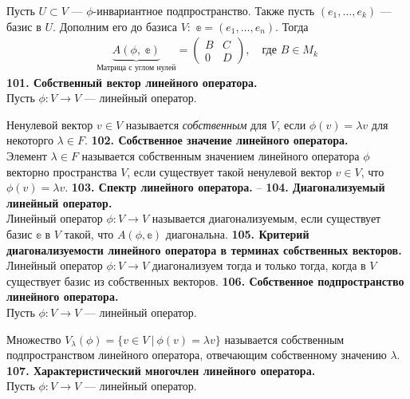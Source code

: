 \documentclass{article}
\begin{document}
Пусть $U\subset V$ --- $\phi$-инвариантное подпространство. Также пусть $(e_1, \ldots, e_k)$ --- базис в $U$. Дополним его до базиса $V\colon$ $\mathbb{e} = (e_1, \ldots, e_n)$. Тогда
\begin{gather}
    \underbrace{A(\phi,\;\mathbb{e})}_{\text{Матрица с углом нулей}} = \begin{pmatrix}
    B& C \\
    0& D
    \end{pmatrix}, \quad\text{где $B\in M_k$}
\end{gather}
\newline
\newline
\textbf{101. Собственный вектор линейного оператора.}\\
Пусть $\phi\colon V \rightarrow V$ --- линейный оператор.

Ненулевой вектор $v\in V$ называется \textit{собственным} для $V$, если $\phi(v) = \lambda v$ для некоторго $\lambda \in F$.
\newline
\newline
\textbf{102. Собственное значение линейного оператора.}\\
Элемент $\lambda \in F$ называется собственным значением линейного оператора $\phi$ векторно пространства $V$, если существует такой ненулевой вектор $v \in V$, что $\phi(v) =\lambda v$. 
\newline
\newline
\textbf{103. Спектр линейного оператора.}
--
\newline
\newline
\textbf{104. Диагонализуемый линейный оператор.}\\
Линейный оператор $\phi\colon V \rightarrow V$ называется диагонализуемым, если существует базис $\mathbb{e}$ в $V$ такой, что $A(\phi, \mathbb{e})$ диагональна. 
\newline
\newline
\textbf{105. Критерий диагонализуемости линейного оператора в терминах собственных векторов.}\\
Линейный оператор $\phi\colon V \rightarrow V$ диагонализуем тогда и только тогда, когда в $V$ существует базис из собственных векторов.
\newline
\newline
\textbf{106. Собственное подпространство линейного оператора.}\\
Пусть $\phi\colon V \rightarrow V$ --- линейный оператор.

Множество $V_{\lambda}(\phi) = \{v\in V\ |\ \phi(v) = \lambda v\}$ называется собственным подпространством линейного оператора, отвечающим собственному значению $\lambda$.
\newline
\newline
\textbf{107. Характеристический многочлен линейного оператора.}\\
Пусть $\phi\colon V \rightarrow V$ --- линейный оператор.
\end{document}
